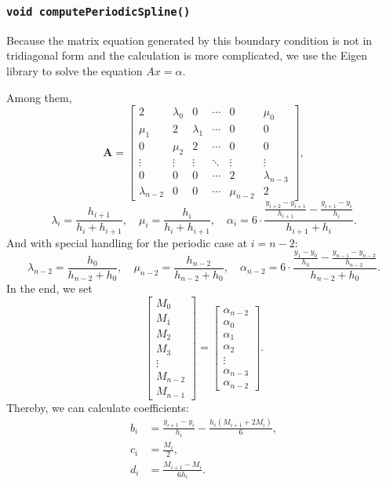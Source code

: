 \documentclass{article}
\begin{document}
\subsubsection{\texttt{void computePeriodicSpline()}}
Because the matrix equation generated by this boundary condition is not in tridiagonal form and the calculation is more complicated, we use the Eigen library to solve the equation \(Ax=\alpha\).\par
Among them, 
\[
\mathbf{A} = \begin{bmatrix}
2 & \lambda_0 & 0 & \cdots & 0 & \mu_0 \\
\mu_1 & 2 & \lambda_1 & \cdots & 0 & 0 \\
0 & \mu_2 & 2 & \cdots & 0 & 0 \\
\vdots & \vdots & \vdots & \ddots & \vdots & \vdots \\
0 & 0 & 0 & \cdots & 2 & \lambda_{n-3} \\
\lambda_{n-2} & 0 & 0 & \cdots & \mu_{n-2} & 2
\end{bmatrix},
\]
\[
\lambda_i = \frac{h_{i+1}}{h_i + h_{i+1}}, \quad
\mu_i = \frac{h_i}{h_i + h_{i+1}}, \quad
\alpha_i = 6 \cdot \frac{\frac{y_{i+2} - y_{i+1}}{h_{i+1}} - \frac{y_{i+1} - y_i}{h_i}}{h_{i+1} + h_i}.
\]
And with special handling for the periodic case at $i = n-2$:
\[
\lambda_{n-2} = \frac{h_0}{h_{n-2} + h_0}, \quad
\mu_{n-2} = \frac{h_{n-2}}{h_{n-2} + h_0}, \quad
\alpha_{n-2} = 6 \cdot \frac{\frac{y_1 - y_0}{h_0} - \frac{y_{n-1} - y_{n-2}}{h_{n-2}}}{h_{n-2} + h_0}.
\]
In the end, we set
\[
\begin{bmatrix}
M_0 \\
M_1 \\
M_2 \\
M_3 \\
\vdots \\
M_{n-2} \\
M_{n-1}
\end{bmatrix} =
\begin{bmatrix}
\alpha_{n-2} \\
\alpha_0 \\
\alpha_1 \\
\alpha_2 \\
\vdots \\
\alpha_{n-3} \\
\alpha_{n-2}
\end{bmatrix}.
\]
Thereby, we can calculate coefficients:
\begin{align}
    b_i &= \frac{y_{i+1} - y_i}{h_i} - \frac{h_i(M_{i+1} + 2M_i)}{6}, \nonumber\\
    c_i &= \frac{M_i}{2}, \nonumber\\ 
    d_i &= \frac{M_{i+1} - M_i}{6h_i}. \nonumber
\end{align}
\end{document}

